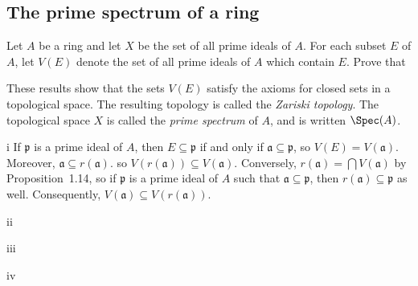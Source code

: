 \subsection{The prime spectrum of a ring}

\begin{exercise}
Let \(A\) be a ring and let \(X\) be the set of all prime ideals of \(A\).
For each subset \(E\) of \(A\), let \(V(E)\) denote the set of all prime ideals of \(A\) which contain \(E\).
Prove that
These results show that the sets \(V(E)\) satisfy the axioms for closed sets in a topological space.
The resulting topology is called the \emph{Zariski topology}.
The topological space \(X\) is called the \emph{prime spectrum} of \(A\), and is written \(\Spec(A)\).
\end{exercise}

\begin{partsolution}{1}{15}{i}
If \(\mathfrak{p}\) is a prime ideal of \(A\), then \(E \subseteq \mathfrak{p}\) if and only if \(\mathfrak{a} \subseteq \mathfrak{p}\), so \(V(E) = V(\mathfrak{a})\).
Moreover, \(\mathfrak{a} \subseteq r(\mathfrak{a})\). so \(V(r(\mathfrak{a})) \subseteq V(\mathfrak{a})\).
Conversely, \(r(\mathfrak{a}) = \bigcap V(\mathfrak{a})\) by Proposition~1.14, so if \(\mathfrak{p}\) is a prime ideal of \(A\) such that \(\mathfrak{a} \subseteq \mathfrak{p}\), then \(r(\mathfrak{a}) \subseteq \mathfrak{p}\) as well.
Consequently, \(V(\mathfrak{a}) \subseteq V(r(\mathfrak{a}))\).
\end{partsolution}

\begin{partsolution}{1}{15}{ii}

\end{partsolution}

\begin{partsolution}{1}{15}{iii}

\end{partsolution}

\begin{partsolution}{1}{15}{iv}

\end{partsolution}